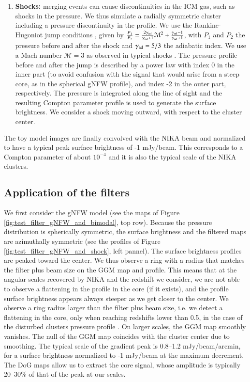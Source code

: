 \documentclass[twocolumn,traditabstract]{aa}
\begin{document}
\begin{enumerate}
\item {\bf Shocks:} merging events can cause discontinuities in the ICM gas, such as shocks in the pressure. We thus simulate a radially symmetric cluster including a pressure discontinuity in the profile. We use the Rankine-Hugoniot jump conditions \citep[see e.g.][for a review]{Sarazin2002}, given by $\frac{P_1}{P_2} = \frac{2 \gamma_{\rm ad}}{\gamma_{\rm ad}+1} \mathcal{M}^2 + \frac{\gamma_{\rm ad}-1}{\gamma_{\rm ad}+1}$, with $P_1$ and $P_2$ the pressure before and after the shock and $\gamma_{\rm ad} = 5/3$ the adiabatic index. We use a Mach number $\mathcal{M} = 3$ as observed in typical shocks \citep[e.g.][]{Markevitch2007}. The pressure profile before and after the jump is described by a power law with index 0 in the inner part (to avoid confusion with the signal that would arise from a steep core, as in the spherical gNFW profile), and index -2 in the outer part, respectively. The pressure is integrated along the line of sight and the resulting Compton parameter profile is used to generate the surface brightness. We consider a shock moving outward, with respect to the cluster center.
\end{enumerate}
The toy model images are finally convolved with the NIKA beam and normalized to have a typical peak surface brightness of -1 mJy/beam. This corresponds to a Compton parameter of about $10^{-4}$ and it is also the typical scale of the NIKA clusters.

\subsection{Application of the filters}
We first consider the gNFW model (see the maps of Figure \ref{fig:test_filter_gNFW_and_bimodal}, top row). Because the pressure distribution is spherically symmetric, the surface brightness and the filtered maps are azimuthally symmetric (see the profiles of Figure \ref{fig:test_filter_gNFW_and_shock}, left pannel). The surface brightness profiles are peaked toward the center. We thus observe a ring with a radius that matches the filter plus beam size on the GGM map and profile. This means that at the angular scales recovered by NIKA and the redshift we consider, we are not able to observe a flattening in the profile in the core (if it exists), and the profile surface brightness appears always steeper as we get closer to the center. We observe a ring radius larger than the filter plus beam size, i.e. we detect a flattening in the core, only when reaching redshifts lower than 0.5, in the case of the disturbed clusters pressure profile \citep[i.e. the flatter that we consider here][]{Arnaud2010}. On larger scales, the GGM map smoothly vanishes. The null of the GGM map coincides with the cluster center due to smoothing. The typical scale of the gradient peak is 0.8--1.2 mJy/beam/arcmin, for a surface brightness normalized to -1 mJy/beam at the maximum decrement. The DoG maps allow us to extract the core signal, whose amplitude is typically 20--30\% of that of the peak at our scales.
\end{document}
